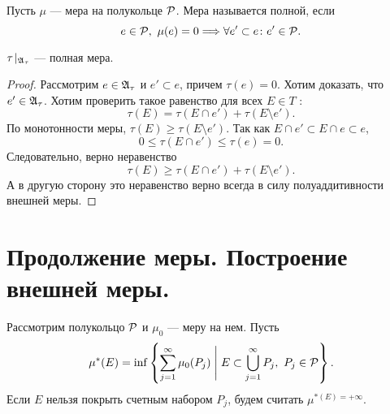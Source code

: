 \begin{defn}
    Пусть $ \mu $ --- мера на полукольце $ \P$. Мера называется {\sf полной}, если
	\[
		e \in \P, ~ \mu(e) = 0 \Longrightarrow \forall e' \subset e \colon e' \in \P
	.\] 
\end{defn}
\begin{cor}
    $ \tau\!\mid_{\A_{\tau }} $ --- полная мера.
\end{cor}
\begin{proof}
	Рассмотрим $ e \in \A_{\tau }$ и $ e' \subset e$, причем $ \tau (e) = 0$. Хотим доказать, что $ e' \in \A_{\tau }$.
	Хотим проверить такое равенство для всех $ E \in T$ :
	\[
		\tau (E) = \tau (E\cap e') + \tau (E \setminus e')
	.\] 
	По монотонности меры, $ \tau (E) \ge \tau (E \setminus e')$.
	Так как $ E \cap e' \subset E \cap e \subset e$,
	\[
		0 \le \tau (E \cap e') \le \tau (e) = 0
	.\] 
	Следовательно, верно неравенство 
	\[
		\tau (E) \ge  \tau (E \cap e') + \tau (E \setminus e')
	.\] 
	А в другую сторону это неравенство верно всегда в силу полуаддитивности внешней меры.
\end{proof}

\section{Продолжение меры. Построение внешней меры.}
\begin{name}
    Рассмотрим полукольцо $ \P$ и $ \mu _0$ --- меру на нем. Пусть 
	\[
		\mu ^{*}(E) = \inf \left\{ \sum_{j=1}^{\infty} \mu _0(P_j) \Biggm| E \subset \bigcup_{j=1}^{\infty} P_j, ~ P_j \in \P \right\}
	.\] 
	Если $ E$ нельзя покрыть счетным набором $ P_j$, будем считать $ \mu ^{*(E) = +\infty}$.
\end{name}

